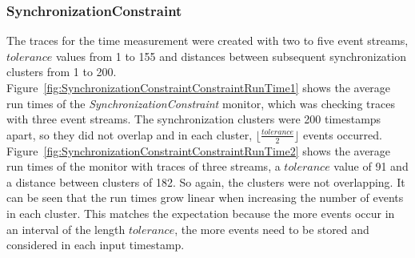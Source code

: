 \subsubsection{SynchronizationConstraint}
The traces for the time measurement were created with two to five event streams, $tolerance$ values from 1 to 155 and distances between subsequent synchronization clusters from 1 to 200.\\
Figure~\ref{fig:SynchronizationConstraintConstraintRunTime1} shows the average run times of the \textit{SynchronizationConstraint} monitor, which was checking traces with three event streams. The synchronization clusters were 200 timestamps apart, so they did not overlap and in each cluster, $\lfloor \frac{tolerance}{2}\rfloor$ events occurred.\\
Figure~\ref{fig:SynchronizationConstraintConstraintRunTime2} shows the average run times of the monitor with traces of three streams, a $tolerance$ value of 91 and a distance between clusters of 182. So again, the clusters were not overlapping. It can be seen that the run times grow linear when increasing the number of events in each cluster. This matches the expectation because the more events occur in an interval of the length $tolerance$, the more events need to be stored and considered in each input timestamp.
